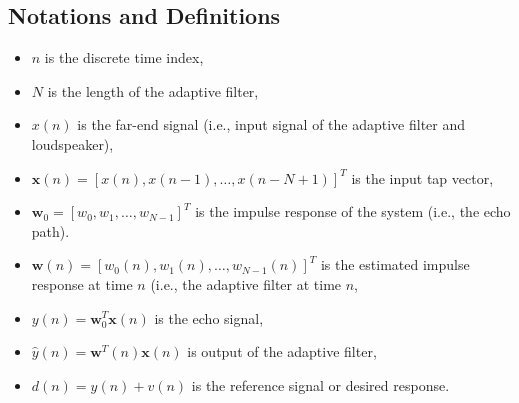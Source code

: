\vspace{-0.3cm}%
\subsection{Notations and Definitions}\label{sec:1.5.1}
\vspace{-0.5cm}
\begin{itemize}
\vspace{-0.3cm}
  \item $n$ is the discrete time index,
  \vspace{-0.3cm}
  \item $N$ is the length of the adaptive filter,
   \vspace{-0.3cm}
  \item $x(n)$ is the far-end signal (i.e., input signal of the adaptive filter and loudspeaker),
   \vspace{-0.3cm}
  \item $\textbf{x}(n)=[x(n), x(n-1),\ldots, x(n-N+1)]^T$ is the input tap vector,
  \vspace{-0.3cm}
  \item $\textbf{w}_0= [w_0,w_1,\ldots,w_{N-1}]^T$ is the impulse response of the system (i.e., the echo path).
  \vspace{-0.3cm}
  \item $\textbf{w}(n)=[w_0(n),w_1(n),\ldots,w_{N-1}(n)]^T$ is the estimated impulse response at time $n$ (i.e., the adaptive filter at time $n$,
  \vspace{-0.3cm}
  \item $y(n)=\textbf{w}_0^{T} \textbf{x}(n)$ is the echo signal,
  \vspace{-0.3cm}
  \item $\hat{y}(n)=\textbf{w}^{T}(n)\textbf{x}(n)$ is output of the adaptive filter,
  \vspace{-0.3cm}
  \item $d(n)=y(n)+v(n)$ is the reference signal or desired response.
  \vspace{-0.3cm}
\end{itemize}

